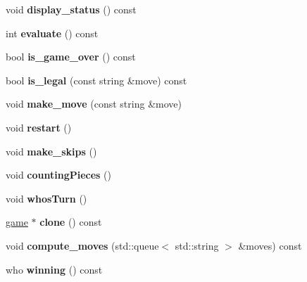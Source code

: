 \begin{DoxyCompactItemize}
\item 
\mbox{\label{classmain__savitch__14_1_1_othello_ab01a4f7aba130133221a11224905e8ce}} 
void {\bfseries display\+\_\+status} () const
\item 
\mbox{\label{classmain__savitch__14_1_1_othello_a57ae44590de8d683592f186ed6bd25b0}} 
int {\bfseries evaluate} () const
\item 
\mbox{\label{classmain__savitch__14_1_1_othello_a540c8b0030e429e0ac30f07e9e8868ec}} 
bool {\bfseries is\+\_\+game\+\_\+over} () const
\item 
\mbox{\label{classmain__savitch__14_1_1_othello_a74ac0d4e6399167037dfc708efdb9033}} 
bool {\bfseries is\+\_\+legal} (const string \&move) const
\item 
\mbox{\label{classmain__savitch__14_1_1_othello_a1066b280efa5cb41039585669282fe06}} 
void {\bfseries make\+\_\+move} (const string \&move)
\item 
\mbox{\label{classmain__savitch__14_1_1_othello_abf872b8074bfa4c04119317dc3b39af2}} 
void {\bfseries restart} ()
\item 
\mbox{\label{classmain__savitch__14_1_1_othello_a3177234195a490eef52343d957e64b5d}} 
void {\bfseries make\+\_\+skips} ()
\item 
\mbox{\label{classmain__savitch__14_1_1_othello_a19f49edfbe82b84922877e00bc854ed8}} 
void {\bfseries counting\+Pieces} ()
\item 
\mbox{\label{classmain__savitch__14_1_1_othello_a21440dbb4511812a76c578a5f546710b}} 
void {\bfseries whos\+Turn} ()
\item 
\mbox{\label{classmain__savitch__14_1_1_othello_a7a5f8495f1a61f6e7b3968e919013c18}} 
\mbox{\hyperlink{classmain__savitch__14_1_1game}{game}} $\ast$ {\bfseries clone} () const
\item 
\mbox{\label{classmain__savitch__14_1_1_othello_a921d4ffa277b0250f187f20b9598ebb1}} 
void {\bfseries compute\+\_\+moves} (std\+::queue$<$ std\+::string $>$ \&moves) const
\item 
\mbox{\label{classmain__savitch__14_1_1_othello_a4ea78b18eea66c944c0a9356349e0fd4}} 
who {\bfseries winning} () const
\end{DoxyCompactItemize}
